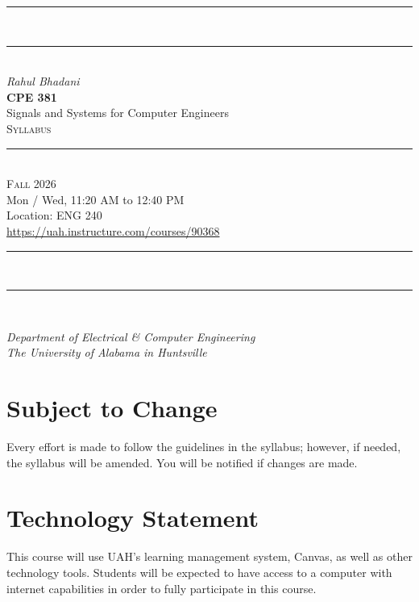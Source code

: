 \documentclass[11pt]{report}
\begin{document}
\begin{titlepage}
\centering
\vspace*{0.5in}

{\color{coral}\rule{\textwidth}{4pt}}\\[3pt]
{\color{winemaroon}\rule{\textwidth}{1.5pt}}\\[40pt]

{\fontsize{22}{26}\selectfont\itshape\color{winemaroon}Rahul Bhadani}\\[54pt]

{\fontsize{42}{46}\selectfont\bfseries\color{winemaroon}CPE 381}\\[16pt]
{\fontsize{22}{28}\selectfont Signals and Systems for Computer Engineers}\\[34pt]

{\Huge\scshape\color{coral}Syllabus}\\[26pt]

{\color{winemaroon}\rule{0.5\textwidth}{1.2pt}}\\[30pt]

{\Large\scshape\color{winemaroon}Fall 2026}\\[12pt]
{\large Mon / Wed, 11:20 AM to 12:40 PM}\\[7pt]
{\large Location: ENG 240}\\[20pt]

{\normalsize\url{https://uah.instructure.com/courses/90368}}

\vfill

{\color{winemaroon}\rule{\textwidth}{1.5pt}}\\[3pt]
{\color{coral}\rule{\textwidth}{4pt}}\\[16pt]
{\itshape Department of Electrical \& Computer Engineering\\
The University of Alabama in Huntsville\par}
\vspace{6pt}
\end{titlepage}

\section*{Subject to Change}
Every effort is made to follow the guidelines in the syllabus; however, if needed, the syllabus will be amended. You will be notified if changes are made.

\section*{Technology Statement}
This course will use UAH's learning management system, Canvas, as well as other technology tools. Students will be expected to have access to a computer with internet capabilities in order to fully participate in this course.
\end{document}
